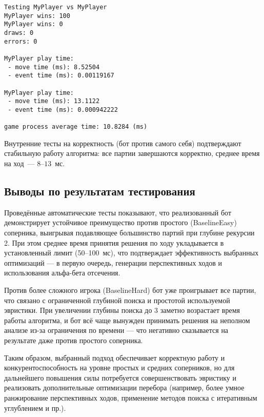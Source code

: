 \begin{lstlisting}[caption={Тест MyPlayer против MyPlayer},label={lst:test_self},numbers=none]
Testing MyPlayer vs MyPlayer
MyPlayer wins: 100
MyPlayer wins: 0
draws: 0
errors: 0

MyPlayer play time:
 - move time (ms): 8.52504
 - event time (ms): 0.00119167

MyPlayer play time:
 - move time (ms): 13.1122
 - event time (ms): 0.000942222

game process average time: 10.8284 (ms)
\end{lstlisting}

Внутренние тесты на корректность (бот против самого себя) подтверждают стабильную работу алгоритма: все партии завершаются корректно, среднее время на ход~--- $8$--$13$~мс.

\subsection{Выводы по результатам тестирования}

Проведённые автоматические тесты показывают, что реализованный бот демонстрирует устойчивое преимущество против простого (BaselineEasy) соперника, выигрывая подавляющее большинство партий при глубине рекурсии 2. При этом среднее время принятия решения по ходу укладывается в установленный лимит (50--100~мс), что подтверждает эффективность выбранных оптимизаций — в первую очередь, генерации перспективных ходов и использования альфа-бета отсечения.

Против более сложного игрока (BaselineHard) бот уже проигрывает все партии, что связано с ограниченной глубиной поиска и простотой используемой эвристики. При увеличении глубины поиска до 3 заметно возрастает время работы алгоритма, и бот всё чаще вынужден принимать решения на неполном анализе из-за ограничения по времени — что негативно сказывается на результате даже против простого соперника.

Таким образом, выбранный подход обеспечивает корректную работу и конкурентоспособность на уровне простых и средних соперников, но для дальнейшего повышения силы потребуется совершенствовать эвристику и реализовать дополнительные оптимизации перебора (например, более умное ранжирование перспективных ходов, применение методов поиска с итеративным углублением и пр.).
